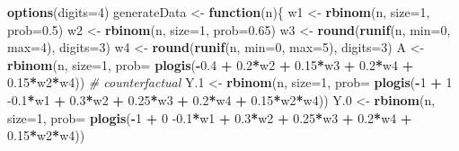 \documentclass[
]{article}
\newenvironment{Shaded}{\begin{snugshade}}{\end{snugshade}}
\newcommand{\CommentTok}[1]{\textcolor[rgb]{0.56,0.35,0.01}{\textit{#1}}}
\newcommand{\ControlFlowTok}[1]{\textcolor[rgb]{0.13,0.29,0.53}{\textbf{#1}}}
\newcommand{\DataTypeTok}[1]{\textcolor[rgb]{0.13,0.29,0.53}{#1}}
\newcommand{\DecValTok}[1]{\textcolor[rgb]{0.00,0.00,0.81}{#1}}
\newcommand{\FloatTok}[1]{\textcolor[rgb]{0.00,0.00,0.81}{#1}}
\newcommand{\KeywordTok}[1]{\textcolor[rgb]{0.13,0.29,0.53}{\textbf{#1}}}
\newcommand{\NormalTok}[1]{#1}
\newcommand{\OperatorTok}[1]{\textcolor[rgb]{0.81,0.36,0.00}{\textbf{#1}}}
\newcommand{\StringTok}[1]{\textcolor[rgb]{0.31,0.60,0.02}{#1}}
\begin{document}
\begin{Shaded}
\begin{Highlighting}[]
\KeywordTok{options}\NormalTok{(}\DataTypeTok{digits=}\DecValTok{4}\NormalTok{)}
\NormalTok{generateData <-}\StringTok{ }\ControlFlowTok{function}\NormalTok{(n)\{}
\NormalTok{  w1 <-}\StringTok{ }\KeywordTok{rbinom}\NormalTok{(n, }\DataTypeTok{size=}\DecValTok{1}\NormalTok{, }\DataTypeTok{prob=}\FloatTok{0.5}\NormalTok{)}
\NormalTok{  w2 <-}\StringTok{ }\KeywordTok{rbinom}\NormalTok{(n, }\DataTypeTok{size=}\DecValTok{1}\NormalTok{, }\DataTypeTok{prob=}\FloatTok{0.65}\NormalTok{)}
\NormalTok{  w3 <-}\StringTok{ }\KeywordTok{round}\NormalTok{(}\KeywordTok{runif}\NormalTok{(n, }\DataTypeTok{min=}\DecValTok{0}\NormalTok{, }\DataTypeTok{max=}\DecValTok{4}\NormalTok{), }\DataTypeTok{digits=}\DecValTok{3}\NormalTok{)}
\NormalTok{  w4 <-}\StringTok{ }\KeywordTok{round}\NormalTok{(}\KeywordTok{runif}\NormalTok{(n, }\DataTypeTok{min=}\DecValTok{0}\NormalTok{, }\DataTypeTok{max=}\DecValTok{5}\NormalTok{), }\DataTypeTok{digits=}\DecValTok{3}\NormalTok{)}
\NormalTok{  A  <-}\StringTok{ }\KeywordTok{rbinom}\NormalTok{(n, }\DataTypeTok{size=}\DecValTok{1}\NormalTok{, }\DataTypeTok{prob=} \KeywordTok{plogis}\NormalTok{(}\OperatorTok{-}\FloatTok{0.4} \OperatorTok{+}\StringTok{ }\FloatTok{0.2}\OperatorTok{*}\NormalTok{w2 }\OperatorTok{+}\StringTok{ }\FloatTok{0.15}\OperatorTok{*}\NormalTok{w3 }\OperatorTok{+}\StringTok{ }\FloatTok{0.2}\OperatorTok{*}\NormalTok{w4 }\OperatorTok{+}\StringTok{ }\FloatTok{0.15}\OperatorTok{*}\NormalTok{w2}\OperatorTok{*}\NormalTok{w4))}
  \CommentTok{# counterfactual}
\NormalTok{  Y}\FloatTok{.1}\NormalTok{ <-}\StringTok{ }\KeywordTok{rbinom}\NormalTok{(n, }\DataTypeTok{size=}\DecValTok{1}\NormalTok{, }\DataTypeTok{prob=} \KeywordTok{plogis}\NormalTok{(}\OperatorTok{-}\DecValTok{1} \OperatorTok{+}\StringTok{ }\DecValTok{1} \FloatTok{-0.1}\OperatorTok{*}\NormalTok{w1 }\OperatorTok{+}\StringTok{ }\FloatTok{0.3}\OperatorTok{*}\NormalTok{w2 }\OperatorTok{+}\StringTok{ }\FloatTok{0.25}\OperatorTok{*}\NormalTok{w3 }\OperatorTok{+}\StringTok{ }\FloatTok{0.2}\OperatorTok{*}\NormalTok{w4 }\OperatorTok{+}\StringTok{ }\FloatTok{0.15}\OperatorTok{*}\NormalTok{w2}\OperatorTok{*}\NormalTok{w4))}
\NormalTok{  Y}\FloatTok{.0}\NormalTok{ <-}\StringTok{ }\KeywordTok{rbinom}\NormalTok{(n, }\DataTypeTok{size=}\DecValTok{1}\NormalTok{, }\DataTypeTok{prob=} \KeywordTok{plogis}\NormalTok{(}\OperatorTok{-}\DecValTok{1} \OperatorTok{+}\StringTok{ }\DecValTok{0} \FloatTok{-0.1}\OperatorTok{*}\NormalTok{w1 }\OperatorTok{+}\StringTok{ }\FloatTok{0.3}\OperatorTok{*}\NormalTok{w2 }\OperatorTok{+}\StringTok{ }\FloatTok{0.25}\OperatorTok{*}\NormalTok{w3 }\OperatorTok{+}\StringTok{ }\FloatTok{0.2}\OperatorTok{*}\NormalTok{w4 }\OperatorTok{+}\StringTok{ }\FloatTok{0.15}\OperatorTok{*}\NormalTok{w2}\OperatorTok{*}\NormalTok{w4))}

\end{Highlighting}
\end{Shaded}
\end{document}
